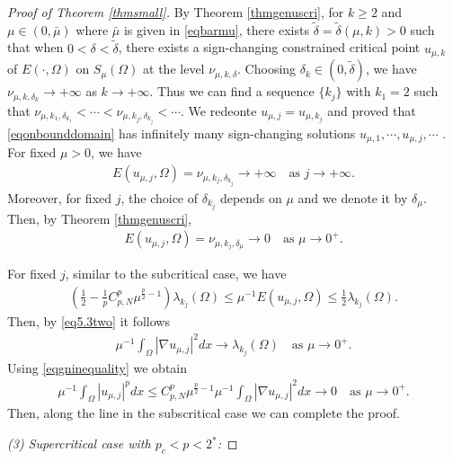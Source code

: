 \documentclass[10pt,a4paper]{article}
\theoremstyle{definition} \theoremstyle{remark}
\numberwithin{equation}{section}
\newcommand{\la}{\lambda}
\begin{document}
\begin{proof}[Proof of Theorem \ref{thmsmall}]
By Theorem \ref{thmgenuscri}, for $k \geq 2$ and $\mu \in (0,\bar\mu)$ where $\bar\mu$ is given in \eqref{eqbarmu}, there exists $\tilde \delta = \tilde \delta(\mu,k) > 0$ such that when $0 < \delta < \tilde \delta$, there exists a sign-changing constrained critical point $u_{\mu,k}$ of $E(\cdot,\Omega)$ on $S_\mu(\Omega)$ at the level $\nu_{\mu,k,\delta}$. Choosing $\delta_k \in (0,\tilde \delta)$, we have $\nu_{\mu,k,\delta_k} \to +\infty$ as $k \to +\infty$. Thus we can find a sequence $\{k_j\}$ with $k_1 = 2$ such that $\nu_{\mu,k_1,\delta_{k_1}} < \cdots < \nu_{\mu,k_j,\delta_{k_j}} < \cdots$. We redeonte $u_{\mu,j} = u_{\mu,k_j}$ and proved that \eqref{eqonbounddomain} has infinitely many sign-changing solutions $u_{\mu,1}, \cdots, u_{\mu,j}, \cdots$ . For fixed $\mu > 0$, we have
\begin{align*}
	E(u_{\mu,j},\Omega) = \nu_{\mu,k_j,\delta_{k_j}} \to +\infty \quad \text{as } j \to +\infty.
\end{align*}
Moreover, for fixed $j$, the choice of $\delta_{k_j}$ depends on $\mu$ and we denote it by $\delta_\mu$. Then, by Theorem \ref{thmgenuscri},
\begin{align*}
	E(u_{\mu,j},\Omega) = \nu_{\mu,k_j,\delta_{\mu}} \to 0 \quad \text{as } \mu \to 0^+.
\end{align*}

For fixed $j$, similar to the subcritical case, we have
\begin{align*}
	\left( \frac12 - \frac1p C_{p,N}^p\mu^{\frac{p}{2}-1}\right)  \la_{k_j}(\Omega) \le \mu^{-1}E(u_{\mu,j},\Omega)  \le \frac12\la_{k_j}(\Omega).
\end{align*}
Then, by \eqref{eq5.3two} it follows
\begin{align*}
	\mu^{-1}\int_\Omega |\nabla u_{\mu,j}|^2dx \to \la_{k_j}(\Omega) \quad \text{as } \mu \to 0^+.
\end{align*}
Using \eqref{eqgninequality} we obtain
\begin{align*}
	\mu^{-1}\int_\Omega|u_{\mu,j}|^pdx \le C_{p,N}^p \mu^{\frac{p}{2}-1} \mu^{-1}\int_\Omega |\nabla u_{\mu,j}|^2dx \to 0 \quad \text{as } \mu \to 0^+.
\end{align*}
Then, along the line in the subscritical case we can complete the proof.

\vskip0.1in
\emph{(3) Supercritical case with $p_c < p < 2^*$:}


\end{proof}
\end{document}
